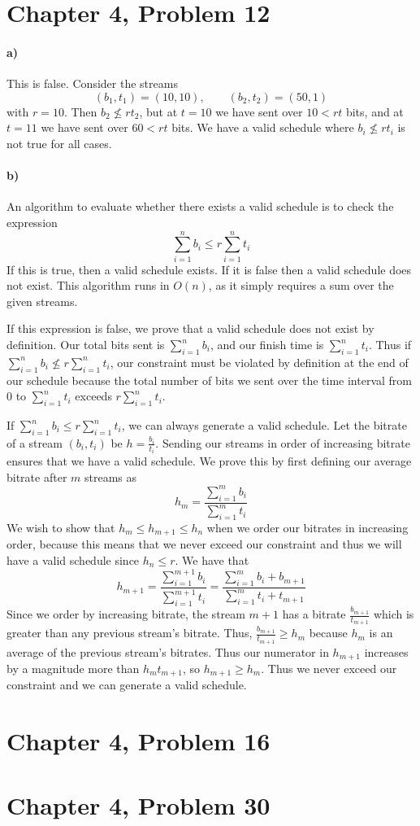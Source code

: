 \documentclass[12pt]{article}
\begin{document}
\pagebreak

\section*{Chapter 4, Problem 12}

\paragraph{a)}

This is false. Consider the streams
\[(b_1,t_1)=(10,10),\qquad(b_2,t_2)=(50,1)\]
with \(r=10\). Then \(b_2\nleq rt_2\), but at \(t=10\) we have sent over \(10<rt\) bits, and at \(t=11\) we have sent over \(60<rt\) bits. We have a valid
schedule where \(b_i\nleq rt_i\) is not true for all cases.

\paragraph{b)}

An algorithm to evaluate whether there exists a valid schedule is to check the expression
\[\sum_{i=1}^n b_i \leq r\sum_{i=1}^n t_i\]
If this is true, then a valid schedule exists. If it is false then a valid schedule does not exist. This algorithm runs in \(O(n)\), as it simply
requires a sum over the given streams.

If this expression is false, we prove that a valid schedule does not exist by definition. Our total bits sent is \(\sum_{i=1}^n b_i\), and our finish time
is \(\sum_{i=1}^n t_i\). Thus if \(\sum_{i=1}^n b_i \nleq r\sum_{i=1}^n t_i\), our constraint must be violated by definition at
the end of our schedule because the total number of bits we sent over the time interval from \(0\) to \(\sum_{i=1}^n t_i\) exceeds \(r\sum_{i=1}^n t_i\).

If \(\sum_{i=1}^n b_i \leq r\sum_{i=1}^n t_i\), we can always generate a valid schedule. Let the bitrate of a stream \((b_i,t_i)\) be \(h=\frac{b_i}{t_i}\).
Sending our streams in order of increasing bitrate ensures that we have a valid schedule. We prove this by first defining our average bitrate after \(m\)
streams as
\[h_m=\frac{\sum_{i=1}^m b_i}{\sum_{i=1}^m t_i}\]
We wish to show that \(h_m\leq h_{m+1}\leq h_n\) when we order our bitrates in increasing order, because this means that we never exceed our constraint and
thus we will have a valid schedule since \(h_n\leq r\). We have that
\[h_{m+1}=\frac{\sum_{i=1}^{m+1} b_i}{\sum_{i=1}^{m+1} t_i}=\frac{\sum_{i=1}^m b_i+b_{m+1}}{\sum_{i=1}^m t_i+t_{m+1}}\]
Since we order by increasing bitrate, the stream \(m+1\) has a bitrate \(\frac{b_{m+1}}{t_{m+1}}\) which is greater than any previous stream's bitrate.
Thus, \(\frac{b_{m+1}}{t_{m+1}}\geq h_m\) because \(h_m\) is an average of the previous stream's bitrates. Thus our numerator in \(h_{m+1}\) increases
by a magnitude more than \(h_mt_{m+1}\), so \(h_{m+1}\geq h_m\). Thus we never exceed our constraint and we can generate a valid schedule.

\pagebreak

\section*{Chapter 4, Problem 16}

\pagebreak

\section*{Chapter 4, Problem 30}
\end{document}
